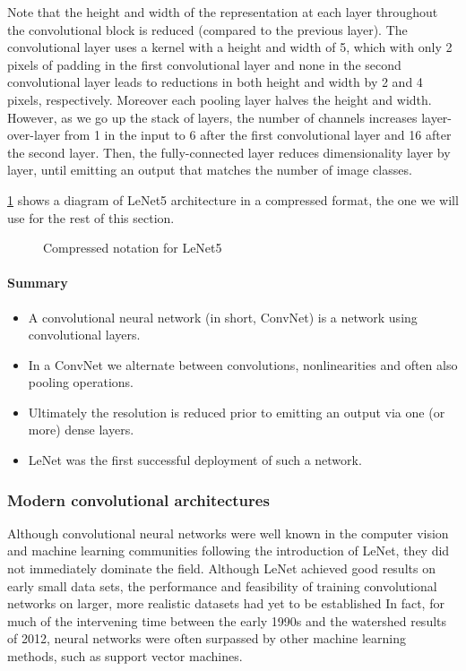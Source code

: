Note that the height and width of the representation at each layer throughout the convolutional block is reduced (compared to the previous layer). The convolutional layer uses a kernel with a height and width of 5, which with only  2  pixels of padding in the first convolutional layer and none in the second convolutional layer leads to reductions in both height and width by 2 and 4 pixels, respectively. Moreover each pooling layer halves the height and width. However, as we go up the stack of layers, the number of channels increases layer-over-layer from 1 in the input to 6 after the first convolutional layer and 16 after the second layer. Then, the fully-connected layer reduces dimensionality layer by layer, until emitting an output that matches the number of image classes.

\cref{fig:lenet-vert} shows a diagram of LeNet5 architecture in a compressed format, the one we will use for the rest of this section.

\begin{figure}[hpt]
	\centering
	
	\caption{Compressed notation for LeNet5}
	\label{fig:lenet-vert}
\end{figure}


\paragraph{Summary}

\begin{itemize}
    \item A convolutional neural network (in short, ConvNet) is a network using convolutional layers.
    \item In a ConvNet we alternate between convolutions, nonlinearities and often also pooling operations.
    \item Ultimately the resolution is reduced prior to emitting an output via one (or more) dense layers.
    \item LeNet was the first successful deployment of such a network.
\end{itemize}

\subsubsection{Modern convolutional architectures}

Although convolutional neural networks were well known in the computer vision and machine learning communities following the introduction of LeNet, they did not immediately dominate the field. Although LeNet achieved good results on early small data sets, the performance and feasibility of training convolutional networks on larger, more realistic datasets had yet to be established
In fact, for much of the intervening time between the early 1990s and the watershed results of 2012, neural networks were often surpassed by other machine learning methods, such as support vector machines.

